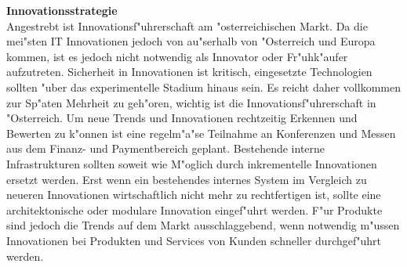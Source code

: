 \textbf{Innovationsstrategie}\\
Angestrebt ist Innovationsf"uhrerschaft am "osterreichischen Markt. Da die mei"sten IT Innovationen jedoch von au"serhalb von "Osterreich und Europa kommen, ist es jedoch nicht notwendig als Innovator oder Fr"uhk"aufer aufzutreten. Sicherheit in Innovationen ist kritisch, eingesetzte Technologien sollten "uber das experimentelle Stadium hinaus sein. Es reicht daher vollkommen zur Sp"aten Mehrheit zu geh"oren, wichtig ist die Innovationsf"uhrerschaft in "Osterreich. \cite{Rogers2003} Um neue Trends und Innovationen rechtzeitig Erkennen und Bewerten zu k"onnen ist eine regelm"a"se Teilnahme an Konferenzen und Messen aus dem Finanz- und Paymentbereich geplant. Bestehende interne Infrastrukturen sollten soweit wie M"oglich durch inkrementelle Innovationen ersetzt werden. Erst wenn ein bestehendes internes System im Vergleich zu neueren Innovationen wirtschaftlich nicht mehr zu rechtfertigen ist, sollte eine architektonische oder modulare Innovation eingef"uhrt werden. F"ur Produkte sind jedoch die Trends auf dem Markt ausschlaggebend, wenn notwendig m"ussen Innovationen bei Produkten und Services von Kunden schneller durchgef"uhrt werden.\\